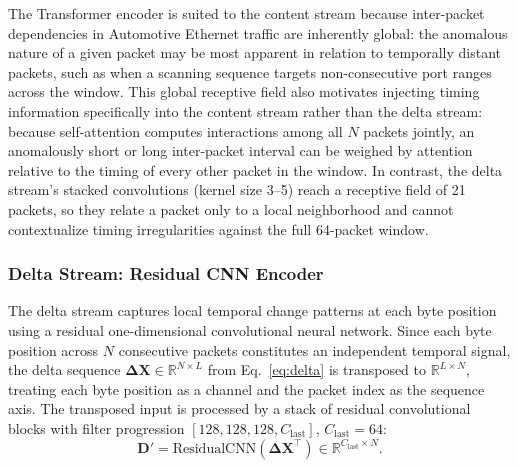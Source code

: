 The Transformer encoder is suited to the content stream because inter-packet dependencies in Automotive Ethernet traffic are inherently global: the anomalous nature of a given packet may be most apparent in relation to temporally distant packets, such as when a scanning sequence targets non-consecutive port ranges across the window. This global receptive field also motivates injecting timing information specifically into the content stream rather than the delta stream: because self-attention computes interactions among all $N$ packets jointly, an anomalously short or long inter-packet interval can be weighed by attention relative to the timing of every other packet in the window. In contrast, the delta stream's stacked convolutions (kernel size 3--5) reach a receptive field of 21 packets, so they relate a packet only to a local neighborhood and cannot contextualize timing irregularities against the full 64-packet window.

\subsubsection{Delta Stream: Residual CNN Encoder}
The delta stream captures local temporal change patterns at each byte position using a residual one-dimensional convolutional neural network. Since each byte position across $N$ consecutive packets constitutes an independent temporal signal, the delta sequence $\mathbf{\Delta X} \in \mathbb{R}^{N \times L}$ from Eq.~\eqref{eq:delta} is transposed to $\mathbb{R}^{L \times N}$, treating each byte position as a channel and the packet index as the sequence axis. The transposed input is processed by a stack of residual convolutional blocks with filter progression $[128, 128, 128, C_{\text{last}}]$, $C_{\text{last}} = 64$:
\begin{equation}
    \mathbf{D}' = \text{ResidualCNN}\!\left(\mathbf{\Delta X}^{\top}\right) \in \mathbb{R}^{C_{\text{last}} \times N}.
    \label{eq:cnn}
\end{equation}

